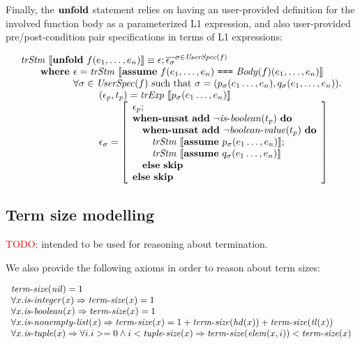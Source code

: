 Finally, the $\textbf{unfold}$ statement relies on having an user-provided definition
for the involved function body as a parameterized L1 expression, and also 
user-provided pre/post-condition pair specifications in terms of L1 expressions:

\[
\begin{array}{l}
\trStm{\unfoldE~f(e_1, \dots, e_n)} \equiv \epsilon;\overline{\epsilon_\sigma}^{\sigma \in \UserSpec{f}}\\
\qquad \textbf{where } \epsilon = \trStm{\assumeE~f(e_1, \dots, e_n)~\texttt{===}~\Body{f}(e_1, \dots, e_n)}\\
\qquad \phantom{\textbf{where }} \forall \sigma \in \UserSpec{f} \textrm{ such that } \sigma = (p_\sigma(e_1\ldots,e_n), q_\sigma(e_1, \ldots, e_n)).\\
\qquad\qquad\qquad\qquad (\epsilon_p, t_p) = \trExps{p_\sigma(e_1\ldots,e_n)}\\
\qquad\qquad\qquad\qquad \epsilon_\sigma = \left[ 
\begin{array}{l}
\epsilon_p;\\
\whenUnsatW~\addE~\neg\isboolean{t_p}~\doW\\
\quad\whenUnsatW~\addE~\neg\booleanvalue{t_p}~\doW\\
\quad\quad\trStm{\assumeE~p_\sigma(e_1\ldots,e_n)};\\
\quad\quad\trStm{\assumeE~q_\sigma(e_1\ldots,e_n)}\\
\quad\elseW~\skipE\\
\elseW~\skipE
\end{array}
\right] \\
\end{array}
\]

\subsection{Term size modelling}

\textcolor{red}{TODO}: intended to be used for reasoning about termination.

We also provide the following axioms in order to reason about
term sizes:

\[
\begin{array}{l}
\mathit{term\mbox{-}size}(\mathit{nil}) = 1\\
\forall x. \mathit{is\mbox{-}integer}(x) \Rightarrow \mathit{term\mbox{-}size}(x) = 1\\
\forall x. \mathit{is\mbox{-}boolean}(x) \Rightarrow \mathit{term\mbox{-}size}(x) = 1\\
\forall x. \mathit{is\mbox{-}nonempty\mbox{-}list}(x) \Rightarrow \mathit{term\mbox{-}size}(x) = 1 + \mathit{term\mbox{-}size}(\mathit{hd}(x)) + \mathit{term\mbox{-}size}(\mathit{tl}(x))\\
\forall x. \mathit{is\mbox{-}tuple}(x) \Rightarrow \forall i. i >= 0 \wedge i < \mathit{tuple\mbox{-}size}(x) \Rightarrow \mathit{term\mbox{-}size}(\mathit{elem}(x, i)) < \mathit{term\mbox{-}size}(x)\\
\end{array}
\]

